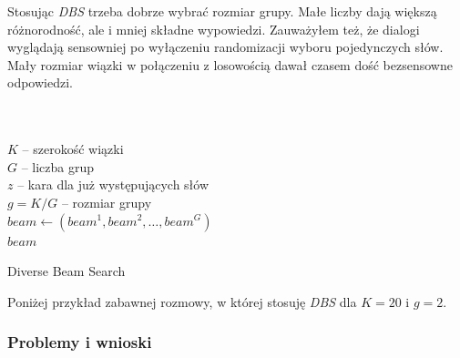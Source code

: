 Stosując \textit{DBS} trzeba dobrze wybrać rozmiar grupy. Małe liczby dają większą różnorodność, ale i mniej składne wypowiedzi. Zauważyłem też, że dialogi wyglądają sensowniej po wyłączeniu randomizacji wyboru pojedynczych słów. Mały rozmiar wiązki w połączeniu z losowością dawał czasem dość bezsensowne odpowiedzi.
\\[1cm]
\begin{algorithm}[H]
    \\\\$K$ -- szerokość wiązki\\
    $G$ -- liczba grup\\
    $z$ -- kara dla już występujących słów\\[5pt]
    $g = K / G$ -- rozmiar grupy\\
    $beam \gets (beam^1, beam^2,\dots, beam^G)$\\
    \Return $beam$
    \caption{Diverse Beam Search}
\end{algorithm}

\vspace{1cm}

\noindent
Poniżej przykład zabawnej rozmowy, w której stosuję \textit{DBS} dla $K=20$ i $g=2$.\\



\subsubsection{Problemy i wnioski}

